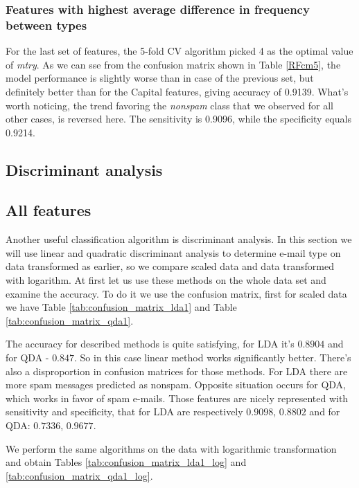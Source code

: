 \documentclass{article}\usepackage[]{graphicx}\usepackage[]{xcolor}
\begin{document}
\subsubsection*{Features with highest average difference in frequency between types}

For the last set of features, the 5-fold CV algorithm picked 4 as the optimal
value of \textit{mtry}. As we can sse from the confusion matrix shown in Table \ref{RFcm5},
the model performance is slightly worse than in case of
the previous set, but definitely better than for the Capital features,
giving accuracy of 0.9139. What's worth noticing, the trend favoring the \textit{nonspam}
class that we observed for all other cases, is reversed here. The sensitivity 
is 0.9096, while the specificity equals 0.9214.

\subsection*{Discriminant analysis}
	
\subsection*{All features}
	
Another useful classification algorithm is discriminant analysis. In this section 
we will use linear and quadratic discriminant analysis to determine e-mail type on 
data transformed as earlier, so we compare scaled data and data transformed with logarithm. 
At first let us use these methods on the whole data set and examine the accuracy. 
To do it we use the confusion matrix, first for scaled data we have Table 
\ref{tab:confusion_matrix_lda1} and Table \ref{tab:confusion_matrix_qda1}.

The accuracy for described methods is quite satisfying, for LDA it's $0.8904$ 
and for QDA - $0.847$. So in this case linear method works significantly better. 
There's also a disproportion in confusion matrices for those methods. For LDA there 
are more spam messages predicted as nonspam. Opposite situation occurs for QDA, which 
works in favor of spam e-mails. Those features are nicely represented with sensitivity 
and specificity, that for LDA are respectively $0.9098$, $0.8802$ and for QDA: $0.7336$, $0.9677$. 

We perform the same algorithms on the data with logarithmic transformation and 
obtain Tables \ref{tab:confusion_matrix_lda1_log} and \ref{tab:confusion_matrix_qda1_log}.
	
\end{document}
